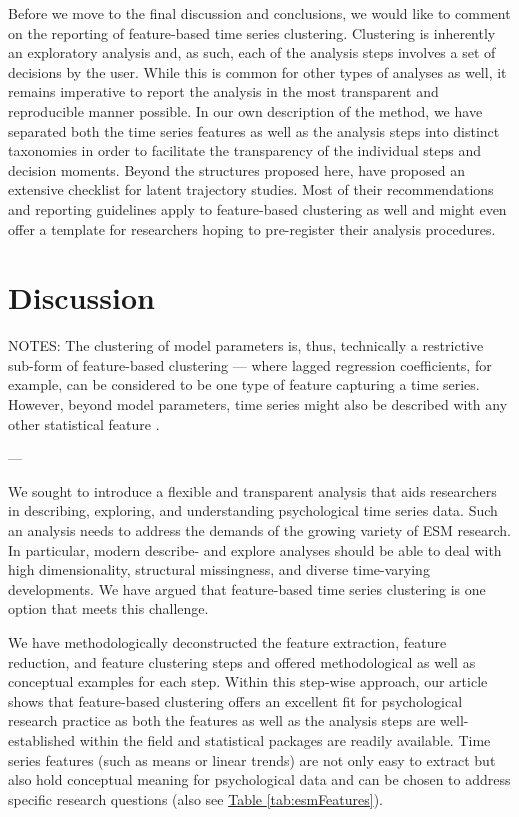 \documentclass[man, 12pt, a4paper, mask, floatsintext]{apa7}
\theoremstyle{break}
\theoremstyle{plain}
\newcommand{\tblref}[2][]{\hyperref[#2]{Table \ref*{#2}#1}}
\begin{document}


Before we move to the final discussion and conclusions, we would like to comment on the reporting of feature-based time series clustering. Clustering is inherently an exploratory analysis and, as such, each of the analysis steps involves a set of decisions by the user. While this is common for other types of analyses as well, it remains imperative to report the analysis in the most transparent and reproducible manner possible. In our own description of the method, we have separated both the time series features as well as the analysis steps into distinct taxonomies in order to facilitate the transparency of the individual steps and decision moments. Beyond the structures proposed here, \citet{vandeschoot2017} have proposed an extensive checklist for latent trajectory studies. Most of their recommendations and reporting guidelines apply to feature-based clustering as well and might even offer a template for researchers hoping to pre-register their analysis procedures.

\section{Discussion}

NOTES:
The clustering of model parameters is, thus, technically a restrictive sub-form of feature-based clustering --- where lagged regression coefficients, for example, can be considered to be one type of feature capturing a time series. However, beyond model parameters, time series might also be described with any other statistical feature \citep{tiano2021}. 

---

We sought to introduce a flexible and transparent analysis that aids researchers in describing, exploring, and understanding psychological time series data. Such an analysis needs to address the demands of the growing variety of ESM research. In particular, modern describe- and explore analyses should be able to deal with high dimensionality, structural missingness, and diverse time-varying developments. We have argued that feature-based time series clustering is one option that meets this challenge. 

We have methodologically deconstructed the feature extraction, feature reduction, and feature clustering steps and offered methodological as well as conceptual examples for each step. Within this step-wise approach, our article shows that feature-based clustering offers an excellent fit for psychological research practice as both the features as well as the analysis steps are well-established within the field and statistical packages are readily available. Time series features (such as means or linear trends) are not only easy to extract but also hold conceptual meaning for psychological data and can be chosen to address specific research questions (also see \tblref{tab:esmFeatures}). 
\end{document}
